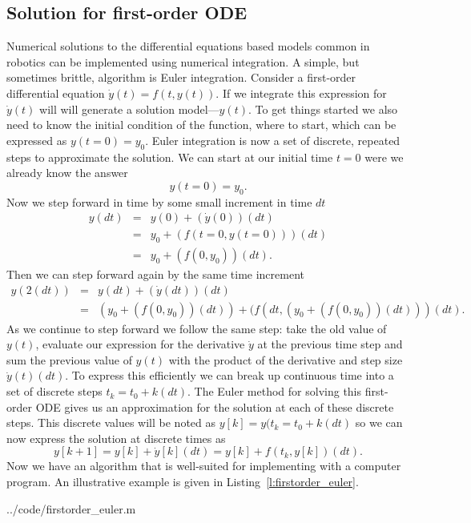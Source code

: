 \subsection{Solution for first-order ODE}
Numerical solutions to the differential equations based models common in robotics can be implemented using numerical integration.  A simple, but sometimes brittle, algorithm is Euler integration.  Consider a first-order differential equation $\dot{y}(t)=f(t,y(t))$.  If we integrate this expression for $\dot{y}(t)$ will will generate a solution model---$y(t)$.   To get things started we also need to know the initial condition of the function, where to start, which can be expressed as $y(t=0)=y_0$.  Euler integration is now a set of discrete, repeated steps to approximate the solution.  We can start at our initial time $t=0$ were we already know the answer
\[
y(t=0) = y_0.
\]
Now we step forward in time by some small increment in time $dt$ 
\begin{eqnarray}
y(dt) & = & y(0) + \left(\dot{y}(0)\right)(dt) \\
      & = & y_0 + (f(t=0,y(t=0)))(dt) \\
      & = & y_0 + (f(0,y_0))(dt).
\end{eqnarray}
Then we can step forward again by the same time increment
\begin{eqnarray}
y(2(dt)) & = & y(dt) + \left(\dot{y}(dt)\right)(dt) \\
         & = & \left(y_0 + (f(0,y_0))(dt)\right) + (f(dt,(y_0 + (f(0,y_0))(dt)))(dt).
\end{eqnarray}
As we continue to step forward we follow the same step: take the old value of $y(t)$, evaluate our expression for the derivative $\dot{y}$ at the previous time step and sum the previous value of $y(t)$ with the product of the derivative and step size $\dot{y}(t)(dt)$.  To express this efficiently we can break up continuous time into a set of discrete steps $t_k = t_0+k(dt)$.  The Euler method for solving this first-order ODE gives us an approximation for the solution at each of these discrete steps. This discrete values will be noted as $y[k] = y(t_k=t_0+k(dt)$ so we can now express the solution at discrete times as
\[
y[k+1] = y[k] + \dot{y}[k](dt) = y[k] + f(t_k,y[k])(dt).
\]
Now we have an algorithm that is well-suited for implementing with a computer program.  An illustrative example is given in Listing~\ref{l:firstorder_euler}.

{../code/firstorder_euler.m}

